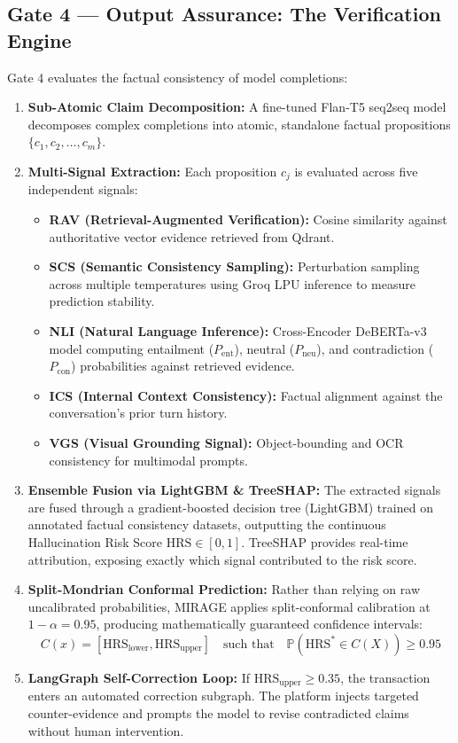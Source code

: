 \documentclass[11pt,a4paper]{article}
\begin{document}
\subsection{Gate 4 — Output Assurance: The Verification Engine}
Gate 4 evaluates the factual consistency of model completions:
\begin{enumerate}[leftmargin=*,itemsep=2pt]
  \item \textbf{Sub-Atomic Claim Decomposition:} A fine-tuned Flan-T5 seq2seq model decomposes complex completions into atomic, standalone factual propositions $\{c_1, c_2, \dots, c_m\}$.
  \item \textbf{Multi-Signal Extraction:} Each proposition $c_j$ is evaluated across five independent signals:
  \begin{itemize}[leftmargin=*,itemsep=1pt]
    \item \textbf{RAV (Retrieval-Augmented Verification):} Cosine similarity against authoritative vector evidence retrieved from Qdrant.
    \item \textbf{SCS (Semantic Consistency Sampling):} Perturbation sampling across multiple temperatures using Groq LPU inference to measure prediction stability.
    \item \textbf{NLI (Natural Language Inference):} Cross-Encoder DeBERTa-v3 model computing entailment ($P_{\text{ent}}$), neutral ($P_{\text{neu}}$), and contradiction ($P_{\text{con}}$) probabilities against retrieved evidence.
    \item \textbf{ICS (Internal Context Consistency):} Factual alignment against the conversation's prior turn history.
    \item \textbf{VGS (Visual Grounding Signal):} Object-bounding and OCR consistency for multimodal prompts.
  \end{itemize}
  \item \textbf{Ensemble Fusion via LightGBM \& TreeSHAP:} The extracted signals are fused through a gradient-boosted decision tree (LightGBM) trained on annotated factual consistency datasets, outputting the continuous Hallucination Risk Score $\text{HRS} \in [0, 1]$. TreeSHAP provides real-time attribution, exposing exactly which signal contributed to the risk score.
  \item \textbf{Split-Mondrian Conformal Prediction:} Rather than relying on raw uncalibrated probabilities, MIRAGE applies split-conformal calibration at $1-\alpha = 0.95$, producing mathematically guaranteed confidence intervals:
  \begin{equation}
    C(x) = [\text{HRS}_{\text{lower}}, \text{HRS}_{\text{upper}}] \quad \text{such that} \quad \mathbb{P}\left(\text{HRS}^* \in C(X)\right) \ge 0.95
  \end{equation}
  \item \textbf{LangGraph Self-Correction Loop:} If $\text{HRS}_{\text{upper}} \ge 0.35$, the transaction enters an automated correction subgraph. The platform injects targeted counter-evidence and prompts the model to revise contradicted claims without human intervention.
\end{enumerate}
\end{document}
